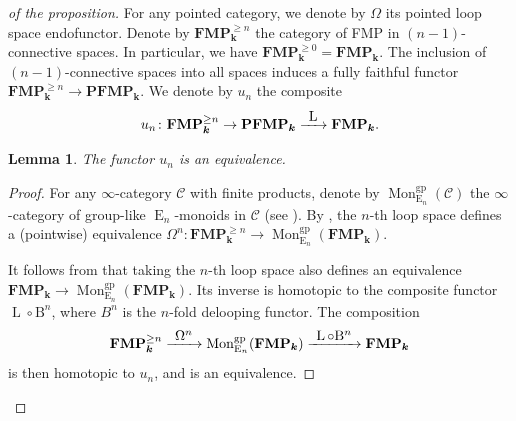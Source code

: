 \documentclass[JEP,XML,SOM,Unicode,NoEqCountersInSection]{cedram}
\let\mathcal\mathscr
\newcommand{\To}[1]{\mathchoice{\xrightarrow{\textstyle\kern4pt#1\kern3pt}}{\stackrel{#1}{\longrightarrow}}{}{}}
\newtheorem{lem}[thm]{Lemma}
\theoremstyle{definition}
\newcommand{\Cc}{\mathcal{C}}
\DeclareMathOperator{\E}{E}
\newcommand{\B}{\mathrm{B}}
\newcommand{\FMP}{\mathbf{FMP}}
\renewcommand{\k}{{\boldsymbol{k}}}
\newcommand{\form}{\operatorname{L}}
\newcommand{\PFMP}{\mathbf{PFMP}}
\begin{document}
\begin{proof}[of the proposition]
For any pointed category, we denote by $\Omega$ its pointed loop space endofunctor.
Denote by $\FMP_\k^{\geq n}$ the category of FMP in $(n-1)$-connective spaces. In particular, we have $\FMP_\k^{\geq 0} = \FMP_\k$.
The inclusion of $(n-1)$-connective spaces into all spaces induces a fully faithful functor $\FMP_\k^{\geq n} \to \PFMP_\k$. We denote by $u_n$ the composite
\[
u_n \colon \FMP_\k^{\geq n} \to \PFMP_\k \To\form \FMP_\k.
\]
\begin{lem}
The functor $u_n$ is an equivalence.
\end{lem}
\begin{proof}
For any $\infty$-category $\Cc$ with finite products, denote by $\operatorname{Mon}_{\E_n}^\mathrm{gp}(\Cc)$ the $\infty$-category of group-like $\E_n$-monoids in $\Cc$ (see \cite[Def.\,5.2.6.6]{lurie:halg}). By \cite[Th.\,5.2.6.10]{lurie:halg}, the $n$-th loop space defines a (pointwise) equivalence $\Omega^n \colon \FMP_\k^{\geq n} \to \operatorname{Mon}_{\E_n}^\mathrm{gp}(\FMP_\k)$.

It follows from \cite[Prop.\,2.15]{blanckatzarkovpandit} that taking the $n$-th loop space also defines an equivalence $\FMP_\k \to \operatorname{Mon}_{\E_n}^\mathrm{gp}(\FMP_\k)$. Its inverse is homotopic to the composite functor $\form \circ \B^n$, where $B^n$ is the $n$-fold delooping functor.
The composition
\[
\FMP_\k^{\geq n} \To{\Omega^n} \operatorname{Mon}_{\E_n}^\mathrm{gp}(\FMP_\k) \To{\form \circ \B^n} \FMP_\k
\]
is then homotopic to $u_n$, and is an equivalence.
\end{proof}


\end{proof}
\end{document}
